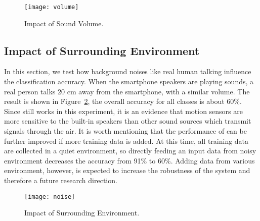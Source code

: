 \begin{figure}[!h]
	\centering
	\texttt{[image: volume]}
	\caption{Impact of Sound Volume.}
	\label{fig:volume}
\end{figure}

\subsection{Impact of Surrounding Environment}\label{sec:impact:noise}
In this section, we test how background noises like real human talking influence the classification accuracy. When the smartphone speakers are playing sounds, a real person talks 20 cm away from the smartphone, with a similar volume.  The result is shown in Figure~\ref{fig:noise}, the overall accuracy for all classes is about 60\%. Since {\systemName} still works in this experiment, it is an evidence that motion sensors are more sensitive to the built-in speakers than other sound sources which transmit signals through the air. 
%
It is worth mentioning that the performance of {\systemName} can be further improved if more training data is added. At this time, all training data are collected in a quiet environment, so directly feeding an input data from noisy environment decreases the accuracy from 91\% to 60\%. Adding data from various environment, however, is expected to increase the robustness of the system and therefore a future research direction. 

\begin{figure}[!h]
	\centering
	\texttt{[image: noise]}
	\caption{Impact of Surrounding Environment.}
	\label{fig:noise}
\end{figure}

